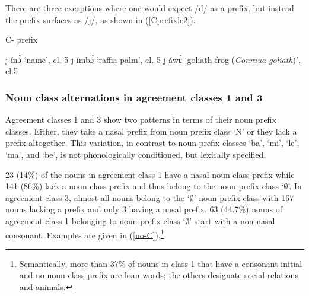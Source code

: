 There are three exceptions where one would expect /d/ as a prefix, but instead the prefix surfaces as /j/, as shown in (\ref{Cprefixle2}). 


\begin{exe} 
\ex\label{Cprefixle2} C- prefix
\begin{xlist}
\ex j-ínɔ̀ `name', cl. 5
\ex j-ímbɔ́ `raffia palm', cl. 5
\ex j-áwɛ̀ `goliath frog ({\itshape Conraua goliath})', cl.5
\end{xlist}
\end{exe}


 


\subsubsection[Noun class alternations]{Noun class alternations in agreement classes 1 and 3} 

Agreement classes 1 and 3 show two patterns in terms of their noun prefix classes. Either, they take a nasal prefix from noun prefix class `N' or they lack a prefix altogether. This variation, in contrast to noun prefix classes `ba', `mi', `le', `ma', and `be', is not phonologically conditioned, but lexically specified. 

23 (14\%)  of the nouns in agreement class 1 have a nasal noun class prefix while 141 (86\%) lack a noun class prefix and thus belong to the noun prefix class `$\emptyset$'. In agreement class 3, almost all nouns belong to the `$\emptyset$' noun prefix class with 167 nouns lacking a prefix and only 3 having a nasal prefix. 63 (44.7\%) nouns of agreement class 1 belonging to noun prefix class `$\emptyset$' start with a non-nasal consonant. Examples are given in (\ref{no-C}).\footnote{Semantically, more than 37\% of nouns in class 1 that have a consonant initial and no noun class prefix are loan words; the others designate social relations and animals.}

